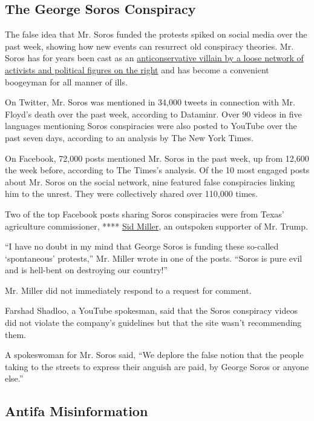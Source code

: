 \hypertarget{the-george-soros-conspiracy}{%
\subsection{The George Soros
Conspiracy}\label{the-george-soros-conspiracy}}

The false idea that Mr. Soros funded the protests spiked on social media
over the past week, showing how new events can resurrect old conspiracy
theories. Mr. Soros has for years been cast as an
\href{https://www.nytimes3xbfgragh.onion/2018/05/29/us/roseanne-george-soros-twitter.html}{anticonservative
villain by a loose network of activists and political figures on the
right} and has become a convenient boogeyman for all manner of ills.

On Twitter, Mr. Soros was mentioned in 34,000 tweets in connection with
Mr. Floyd's death over the past week, according to Dataminr. Over 90
videos in five languages mentioning Soros conspiracies were also posted
to YouTube over the past seven days, according to an analysis by The New
York Times.

On Facebook, 72,000 posts mentioned Mr. Soros in the past week, up from
12,600 the week before, according to The Times's analysis. Of the 10
most engaged posts about Mr. Soros on the social network, nine featured
false conspiracies linking him to the unrest. They were collectively
shared over 110,000 times.

Two of the top Facebook posts sharing Soros conspiracies were from
Texas' agriculture commissioner, ****
\href{https://www.facebookcorewwwi.onion/MillerForTexas/}{Sid Miller},
an outspoken supporter of Mr. Trump.

``I have no doubt in my mind that George Soros is funding these
so-called `spontaneous' protests,'' Mr. Miller wrote in one of the
posts. ``Soros is pure evil and is hell-bent on destroying our
country!''

Mr. Miller did not immediately respond to a request for comment.

Farshad Shadloo, a YouTube spokesman, said that the Soros conspiracy
videos did not violate the company's guidelines but that the site wasn't
recommending them.

A spokeswoman for Mr. Soros said, ``We deplore the false notion that the
people taking to the streets to express their anguish are paid, by
George Soros or anyone else.''

\hypertarget{antifa-misinformation}{%
\subsection{Antifa Misinformation}\label{antifa-misinformation}}

